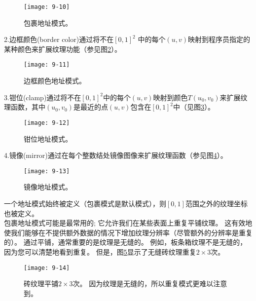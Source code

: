 \begin{figure}[h]
    \texttt{[image: 9-10]}
    \centering
    \caption{包裹地址模式。}
    \label{fig:9-10}
\end{figure}

\begin{flushleft}
2.边框颜色(border color)通过将不在$[0,1]^{2}$ 中的每个$(u,v)$映射到程序员指定的某种颜色来扩展纹理功能（参见图\ref{fig:9-11}）。
\end{flushleft}

\begin{figure}[h]
    \texttt{[image: 9-11]}
    \centering
    \caption{边框颜色地址模式。}
    \label{fig:9-11}
\end{figure}

\begin{flushleft}
3.钳位(clamp)通过将不在$[0,1]^{2}$中的每个$(u,v)$映射到颜色$T(u_{0},v_{0})$来扩展纹理函数，其中$(u_{0},v_{0})$是最近的点$(u,v)$包含在$[0,1]^{2}$中（见图\ref{fig:9-12}）。
\end{flushleft}

\begin{figure}[h]
    \texttt{[image: 9-12]}
    \centering
    \caption{钳位地址模式。}
    \label{fig:9-12}
\end{figure}

\begin{flushleft}
4.镜像(mirror)通过在每个整数结处镜像图像来扩展纹理函数（参见图\ref{fig:9-13}）。
\end{flushleft}

\begin{figure}[h]
    \texttt{[image: 9-13]}
    \centering
    \caption{镜像地址模式。}
    \label{fig:9-13}
\end{figure}

\begin{flushleft}
一个地址模式始终被定义（包裹模式是默认模式），则$[0,1]$范围之外的纹理坐标也被定义。\\
包裹地址模式可能是最常用的; 它允许我们在某些表面上重复平铺纹理。 这有效地使我们能够在不提供额外数据的情况下增加纹理分辨率（尽管额外的分辨率是重复的）。 通过平铺，通常重要的是纹理是无缝的。 例如，板条箱纹理不是无缝的，因为您可以清楚地看到重复。 但是，图\ref{fig:9-14}显示了无缝砖纹理重复$2\times 3$次。
\end{flushleft}

\begin{figure}[h]
    \texttt{[image: 9-14]}
    \centering
    \caption{砖纹理平铺$2\times 3$次。 因为纹理是无缝的，所以重复模式更难以注意到。}
    \label{fig:9-14}
\end{figure}

